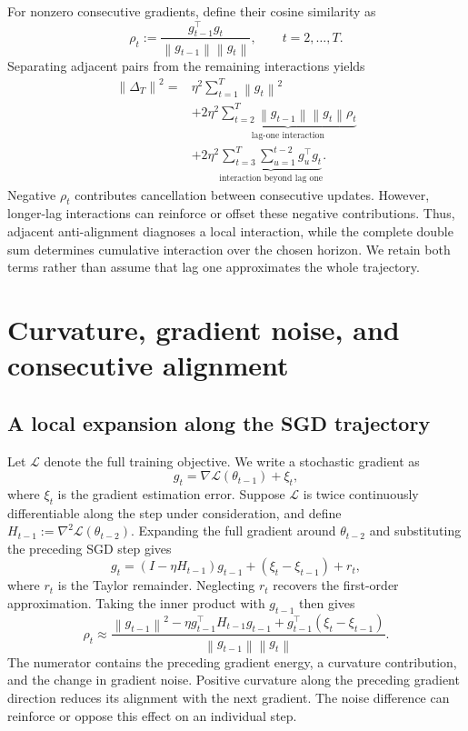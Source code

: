 \documentclass[11pt]{article}
\newcommand{\norm}[1]{\left\lVert#1\right\rVert}
\newcommand{\Loss}{\mathcal{L}}
\begin{document}
For nonzero consecutive gradients, define their cosine similarity as
\begin{equation}
  \rho_t:=\frac{g_{t-1}^\top g_t}{\norm{g_{t-1}}\norm{g_t}},
  \qquad t=2,\ldots,T.
  \label{eq:rho}
\end{equation}
Separating adjacent pairs from the remaining interactions yields
\begin{equation}
\begin{aligned}
\norm{\Delta_T}^2={}&\eta^2\sum_{t=1}^T\norm{g_t}^2\\
 &+2\eta^2\underbrace{\sum_{t=2}^T
    \norm{g_{t-1}}\norm{g_t}\rho_t}_{\text{lag-one interaction}}\\
 &+2\eta^2\underbrace{\sum_{t=3}^T\sum_{u=1}^{t-2}
    g_u^\top g_t}_{\text{interaction beyond lag one}}.
\end{aligned}
\label{eq:lag-split}
\end{equation}
Negative $\rho_t$ contributes cancellation between consecutive updates. However,
longer-lag interactions can reinforce or offset these negative contributions.
Thus, adjacent anti-alignment diagnoses a local interaction, while the complete
double sum determines cumulative interaction over the chosen horizon. We retain
both terms rather than assume that lag one approximates the whole trajectory.

\section{Curvature, gradient noise, and consecutive alignment}

\subsection{A local expansion along the SGD trajectory}

Let $\Loss$ denote the full training objective. We write a stochastic gradient
as
\begin{equation}
  g_t=\nabla\Loss(\theta_{t-1})+\xi_t,
  \label{eq:noise-model}
\end{equation}
where $\xi_t$ is the gradient estimation error. Suppose $\Loss$ is twice
continuously differentiable along the step under consideration, and define
$H_{t-1}:=\nabla^2\Loss(\theta_{t-2})$. Expanding the full gradient around
$\theta_{t-2}$ and substituting the preceding SGD step gives
\begin{equation}
  g_t=(I-\eta H_{t-1})g_{t-1}+(\xi_t-\xi_{t-1})+r_t,
  \label{eq:gradient-evolution}
\end{equation}
where $r_t$ is the Taylor remainder. Neglecting $r_t$ recovers the first-order
approximation. Taking the inner product with $g_{t-1}$ then gives
\begin{equation}
\rho_t\approx
\frac{\norm{g_{t-1}}^2-\eta g_{t-1}^\top H_{t-1}g_{t-1}
      +g_{t-1}^\top(\xi_t-\xi_{t-1})}
     {\norm{g_{t-1}}\norm{g_t}}.
\label{eq:rho-expanded}
\end{equation}
The numerator contains the preceding gradient energy, a curvature contribution,
and the change in gradient noise. Positive curvature along the preceding
gradient direction reduces its alignment with the next gradient. The noise
difference can reinforce or oppose this effect on an individual step.
\end{document}
